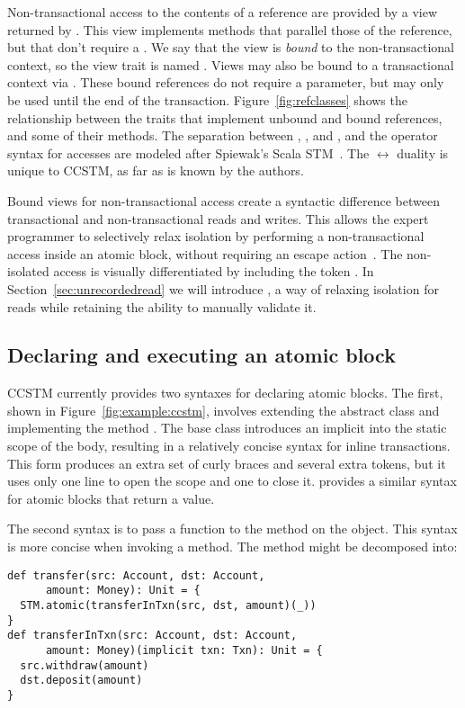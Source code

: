 Non-transactional access to the contents of a reference are provided by a view
returned by .  This view implements methods that parallel those of
the reference, but that don't require a .  We say that the view
is \textit{bound} to the non-transactional context, so the view trait is
named .  Views may also be bound to a transactional context
via .  These bound references do not require a 
parameter, but may only be used until the end of the transaction.
Figure~\ref{fig:refclasses} shows the
 relationship between the traits that implement unbound
and bound references, and some of their methods.  The separation between
, , and , and the operator syntax for
accesses are modeled after Spiewak's Scala STM~\cite{github:spiewak}.
The  $ \leftrightarrow $  duality is unique
to CCSTM, as far as is known by the authors.

Bound views for non-transactional access create a syntactic difference
between transactional and non-transactional reads and writes.
This allows the expert programmer to selectively relax isolation by
performing a non-transactional access inside an atomic block, without
requiring an escape action~\cite{escapeaction}.  The non-isolated access
is visually differentiated by including the token .  In
Section~\ref{sec:unrecordedread} we will introduce ,
a way of relaxing isolation for reads while retaining the ability to
manually validate it.

\subsection{Declaring and executing an atomic block}

CCSTM currently provides two syntaxes for declaring atomic blocks.  The first,
shown in Figure~\ref{fig:example:ccstm}, involves extending the
abstract class  and implementing the method .  The base class introduces an implicit  into the
static scope of the body, resulting in a relatively concise syntax for
inline transactions.  This form produces an extra set of curly braces
and several extra tokens, but it uses only one line to open the scope
and one to close it.   provides a similar syntax
for atomic blocks that return a value.

The second syntax is to pass a function \code{~=>~}
to the  method on the  object.  This syntax is more
concise when invoking a method.  The  method
might be decomposed into:
\lstset{numbers=none}
\begin{lstlisting}
def transfer(src: Account, dst: Account,
      amount: Money): Unit = {
  STM.atomic(transferInTxn(src, dst, amount)(_))
}
def transferInTxn(src: Account, dst: Account,
      amount: Money)(implicit txn: Txn): Unit = {
  src.withdraw(amount)
  dst.deposit(amount)
}
\end{lstlisting}
\lstset{numbers=left}

